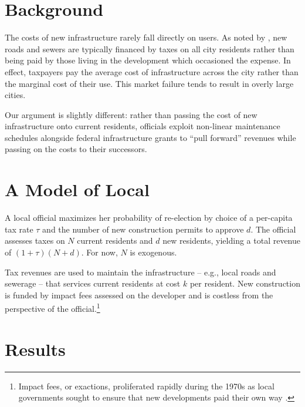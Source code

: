 \documentclass[12pt]{article}
\begin{document}
\section{Background \label{sec:background}}

The costs of new infrastructure rarely fall directly on users. As noted by \citet{brueckner2000urban}, new roads and sewers are typically financed by taxes on all city residents rather than being paid by those living in the development which occasioned the expense. In effect, taxpayers pay the average cost of infrastructure across the city rather than the marginal cost of their use. This market failure tends to result in overly large cities.

Our argument is slightly different: rather than passing the cost of new infrastructure onto current residents, officials exploit non-linear maintenance schedules alongside federal infrastructure grants to ``pull forward'' revenues while passing on the costs to their successors.

\section{A Model of Local }

A local official maximizes her probability of re-election by choice of a per-capita tax rate $\tau$ and the number of new construction permits to approve $d$. The official assesses taxes on $N$ current residents and $d$ new residents, yielding a total revenue of $(1 + \tau)(N+d)$. For now, $N$ is exogenous. \citep{knight_endogenous_2002}

Tax revenues are used to maintain the infrastructure -- e.g., local roads and sewerage -- that services current residents at cost $k$ per resident. New construction is funded by impact fees assessed on the developer and is costless from the perspective of the official.\footnote{Impact fees, or exactions, proliferated rapidly during the 1970s as local governments sought to ensure that new developments paid their own way \citet{altshuler_regulation_2000}.}


\section{Results \label{sec:results}}

% 



% 
\end{document}
